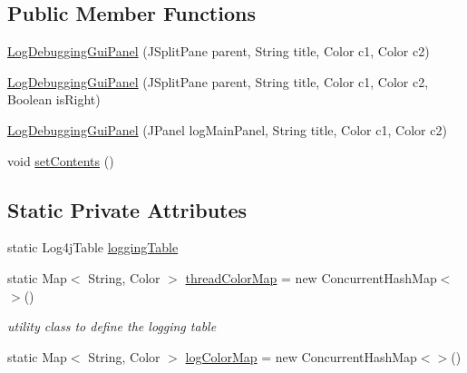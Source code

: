 \subsection*{Public Member Functions}
\begin{DoxyCompactItemize}
\item 
\hyperlink{classit_1_1emarolab_1_1cagg_1_1debugging_1_1baseComponents_1_1customPanel_1_1LogDebuggingGuiPanel_afa20e2a619c9544832db615d4071a4fc}{Log\-Debugging\-Gui\-Panel} (J\-Split\-Pane parent, String title, Color c1, Color c2)
\item 
\hyperlink{classit_1_1emarolab_1_1cagg_1_1debugging_1_1baseComponents_1_1customPanel_1_1LogDebuggingGuiPanel_a2ed427dce4fe241483aa365111c0e7a2}{Log\-Debugging\-Gui\-Panel} (J\-Split\-Pane parent, String title, Color c1, Color c2, Boolean is\-Right)
\item 
\hyperlink{classit_1_1emarolab_1_1cagg_1_1debugging_1_1baseComponents_1_1customPanel_1_1LogDebuggingGuiPanel_aaee903510d99be3fdc78f663117f2eec}{Log\-Debugging\-Gui\-Panel} (J\-Panel log\-Main\-Panel, String title, Color c1, Color c2)
\item 
void \hyperlink{classit_1_1emarolab_1_1cagg_1_1debugging_1_1baseComponents_1_1customPanel_1_1LogDebuggingGuiPanel_ade62f19752a33fb0175cf314021a36d9}{set\-Contents} ()
\end{DoxyCompactItemize}
\subsection*{Static Private Attributes}
\begin{DoxyCompactItemize}
\item 
static Log4j\-Table \hyperlink{classit_1_1emarolab_1_1cagg_1_1debugging_1_1baseComponents_1_1customPanel_1_1LogDebuggingGuiPanel_ab72d95ae3ca215e0c2595f1d34b7cd3e}{logging\-Table}
\item 
static Map$<$ String, Color $>$ \hyperlink{classit_1_1emarolab_1_1cagg_1_1debugging_1_1baseComponents_1_1customPanel_1_1LogDebuggingGuiPanel_afb89a234014986b247c5feb456bcfd3c}{thread\-Color\-Map} = new Concurrent\-Hash\-Map$<$$>$()
\begin{DoxyCompactList}\small\item\em utility class to define the logging table \end{DoxyCompactList}\item 
static Map$<$ String, Color $>$ \hyperlink{classit_1_1emarolab_1_1cagg_1_1debugging_1_1baseComponents_1_1customPanel_1_1LogDebuggingGuiPanel_ac3f784693419383cb40b16130a1c16d4}{log\-Color\-Map} = new Concurrent\-Hash\-Map$<$$>$()
\end{DoxyCompactItemize}
